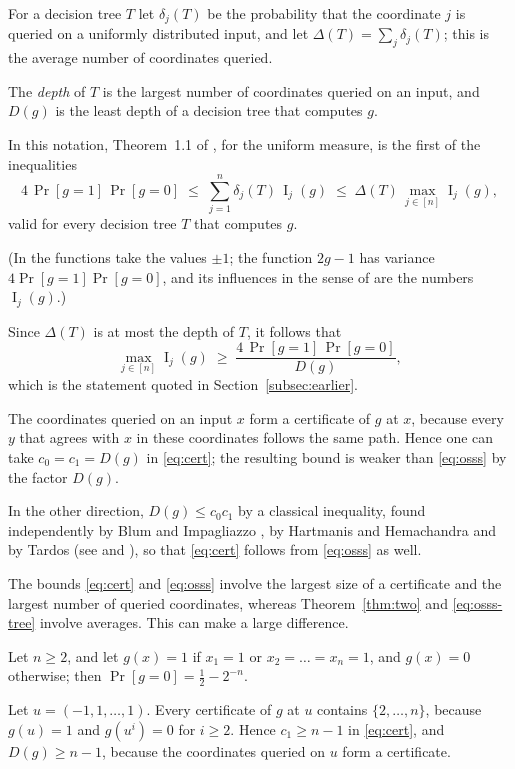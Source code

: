\documentclass[11pt,reqno]{amsart}
\theoremstyle{definition}
\theoremstyle{remark}
\numberwithin{equation}{section}
\theoremstyle{named}
\theoremstyle{plain}
\newcommand{\I}{\operatorname{I}}
\begin{document}
For a decision tree $T$ let $\delta_j(T)$ be the probability that the coordinate $j$ is
queried on a uniformly distributed input, and let $\Delta(T)=\sum_{j}\delta_j(T)$; this is the
average number of coordinates queried.

The \emph{depth} of $T$ is the largest number of coordinates
queried on an input, and $D(g)$ is the least depth of a decision tree that computes $g$.

In this
notation, Theorem~1.1 of \cite{OSSS}, for the uniform measure, is the first of the inequalities
\begin{equation}\label{eq:osss-tree}
   4\,\Pr[g=1]\,\Pr[g=0]\;\le\;\sum_{j=1}^{n}\delta_j(T)\,\I_j(g)\;\le\;\Delta(T)\,\max_{j\in[n]}\I_j(g),
\end{equation}
valid for every decision tree $T$ that computes $g$.

(In \cite{OSSS} the functions take the values
$\pm1$; the function $2g-1$ has variance $4\Pr[g=1]\Pr[g=0]$, and its influences in the sense of
\cite{OSSS} are the numbers $\I_j(g)$.)

Since $\Delta(T)$ is at most the depth of $T$, it follows
that
\begin{equation}\label{eq:osss}
   \max_{j\in[n]}\I_j(g)\;\ge\;\frac{4\,\Pr[g=1]\,\Pr[g=0]}{D(g)} ,
\end{equation}
which is the statement quoted in Section~\ref{subsec:earlier}.

The coordinates queried on an input
$x$ form a certificate of $g$ at $x$, because every $y$ that agrees with $x$ in these coordinates
follows the same path. Hence one can take $c_0=c_1=D(g)$ in \eqref{eq:cert}; the resulting bound is
weaker than \eqref{eq:osss} by the factor $D(g)$.

In the other direction, $D(g)\le c_0c_1$ by a
classical inequality, found independently by Blum and Impagliazzo \cite{BI}, by Hartmanis and
Hemachandra \cite{HH} and by Tardos \cite{Tar} (see \cite[p.~221]{Smy02} and
\cite[Section~6]{KT}), so that
\eqref{eq:cert} follows from
\eqref{eq:osss} as well.

The bounds \eqref{eq:cert} and \eqref{eq:osss} involve the largest size of a certificate and the
largest number of queried coordinates, whereas Theorem~\ref{thm:two} and \eqref{eq:osss-tree} involve
averages. This can make a large difference.

Let $n\ge2$, and let $g(x)=1$ if $x_1=1$ or
$x_2=\dots=x_n=1$, and $g(x)=0$ otherwise; then $\Pr[g=0]=\frac12-2^{-n}$.

Let $u=(-1,1,\dots,1)$.
Every certificate of $g$ at $u$ contains $\{2,\dots,n\}$, because $g(u)=1$ and $g(u^{i})=0$ for
$i\ge2$. Hence $c_1\ge n-1$ in \eqref{eq:cert}, and $D(g)\ge n-1$, because the coordinates queried on
$u$ form a certificate.
\end{document}
